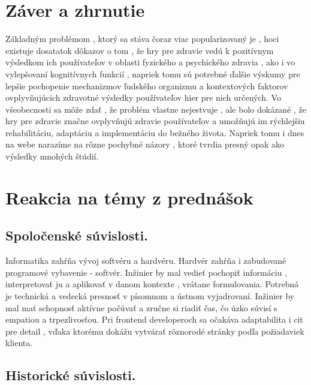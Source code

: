 \documentclass[10pt,oneside,slovak,a4paper]{article}
\begin{document}
\section{Záver a zhrnutie} \label{dolezita}

Základným problémom , ktorý sa stáva čoraz viac popularizovaný je , hoci existuje dosatatok dôkazov o tom , že hry pre zdravie vedú k pozitívnym výsledkom ich používateľov v oblasti fyzického a psychického zdravia , ako i vo vylepšovaní kognitívnych funkcií , napriek tomu sú potrebné ďalšie výskumy pre lepšie pochopenie mechanizmov ľudského organizmu a kontextových faktorov ovplyvňujúcich zdravotné výsledky používateľov hier pre nich určených. Vo všeobecnosti sa môže zdať , že problém vlastne nejestvuje , ale bolo dokázané , že hry pre zdravie značne ovplyvňujú zdravie používateľov a umožňujú im rýchlejšiu rehabilitáciu, adaptáciu a implementáciu do bežného života. Napriek tomu i dnes na webe narazíme na rôzne pochybné názory , ktoré tvrdia presný opak ako výsledky mnohých štúdií.
\section{Reakcia na témy z prednášok}
\subsection{Spoločenské súvislosti.}
Informatika zahŕňa vývoj softvéru a hardvéru. Hardvér zahŕňa i zabudované programové vybavenie - softvér. Inžinier by mal vedieť pochopiť informáciu , interpretovať ju a aplikovať v danom kontexte , vrátane formulovania. Potrebná je technická a vedecká presnosť v písomnom a ústnom vyjadrovaní. Inžinier by mal mať schopnosť aktívne počúvať a zručne si riadiť čas, čo úzko súvisí s empatiou  a trpezlivosťou. Pri frontend developeroch sa očakáva adaptabilita i cit pre detail , vďaka ktorému dokážu vytvárať rôznorodé stránky podľa požiadaviek klienta.
\subsection{Historické súvislosti.}
\end{document}
